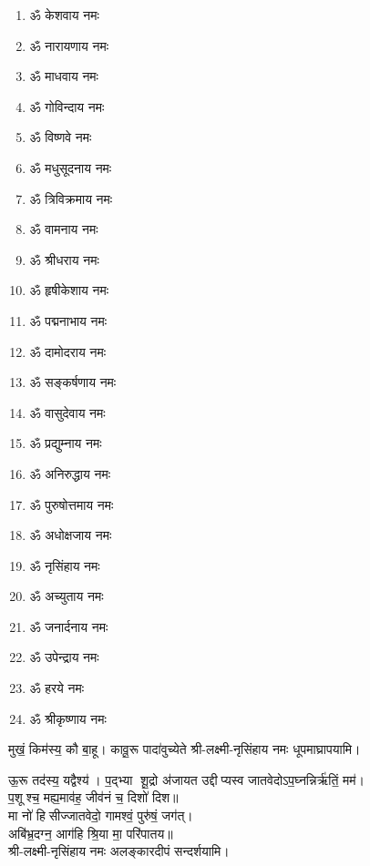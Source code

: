 \begin{center}
\begin{multicols}{2}
\begin{enumerate}
\item ॐ केशवाय नमः
\item ॐ नारायणाय नमः
\item ॐ माधवाय नमः
\item ॐ गोविन्दाय नमः
\item ॐ विष्णवे नमः	
\item ॐ मधुसूदनाय नमः
\item ॐ त्रिविक्रमाय नमः
\item ॐ वामनाय नमः
\item ॐ श्रीधराय नमः
\item ॐ हृषीकेशाय नमः
\item ॐ पद्मनाभाय नमः
\item ॐ दामोदराय नमः
\item ॐ सङ्कर्षणाय नमः
\item ॐ वासुदेवाय नमः
\item ॐ प्रद्युम्नाय नमः
\item ॐ अनिरुद्धाय नमः
\item ॐ पुरुषोत्तमाय नमः
\item ॐ अधोक्षजाय नमः
\item ॐ नृसिंहाय नमः
\item ॐ अच्युताय नमः
\item ॐ जनार्दनाय नमः
\item ॐ उपेन्द्राय नमः 
\item ॐ हरये नमः
\item ॐ श्रीकृष्णाय नमः
\end{enumerate}
\end{multicols}

\begingroup
\centering
\setlength{\columnseprule}{1pt}
\let\chapt\sect

\endgroup

  

{मुखं॒ किम॑स्य॒ कौ बा॒हू। कावू॒रू पादा॑वुच्येते}
श्री-लक्ष्मी-नृसिंहाय नमः धूपमाघ्रापयामि।\medskip
 
{ऊ॒रू तद॑स्य॒ यद्वैश्य॑। प॒द्भ्या शू॒द्रो अ॑जायत}
उद्दीप्यस्व जातवेदोऽप॒घ्नन्निर्ऋ॑तिं॒ मम॑।\\
 प॒शूश्च॒ मह्य॒माव॑ह॒ जीव॑नं च॒ दिशो॑ दिश॥ \\
मा नो॑ हिसीज्जातवेदो॒ गामश्वं॒ पुरु॑षं॒ जग॑त्।\\
अबि॑भ्र॒दग्न॒ आग॑हि श्रि॒या मा॒ परि॑पातय॥ \\
श्री-लक्ष्मी-नृसिंहाय नमः अलङ्कारदीपं सन्दर्शयामि।\medskip


\end{center}
